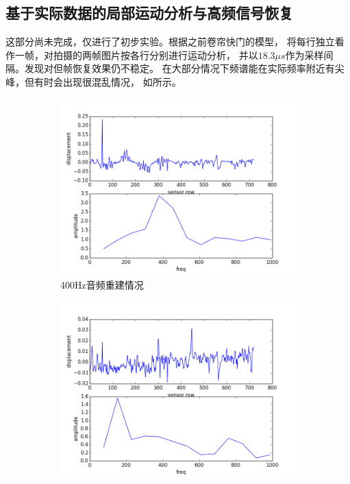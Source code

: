 
\subsection{基于实际数据的局部运动分析与高频信号恢复}

这部分尚未完成，仅进行了初步实验。根据之前卷帘快门的模型，
将每行独立看作一帧，对拍摄的两帧图片按各行分别进行运动分析，
并以$18.3\mu s$作为采样间隔。发现对但帧恢复效果仍不稳定。
在大部分情况下频谱能在实际频率附近有尖峰，但有时会出现很混乱情况，
如所示。
\begin{figure}[h!]\begin{center}
    \begin{subfigure}[b]{.5\figwidth}
        \includegraphics[width=.5\figwidth]{res/400-0.png}
        \caption{400Hz音频重建情况}
    \end{subfigure}
    \begin{subfigure}[b]{.5\figwidth}
        \includegraphics[width=.5\figwidth]{res/400-1.png}

\end{subfigure}
\end{center}
\end{figure}
